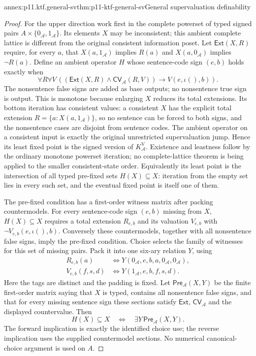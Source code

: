 \begin{annexitem}{annex:p11.ktf.general-sv}{thm:p11-ktf-general-sv}{General supervaluation definability}
\begin{proof}
For the upper direction work first in the complete powerset of
typed signed pairs \(A\times\{0_{\mathcal A},1_{\mathcal A}\}\).
Its elements \(X\) may be inconsistent; this ambient complete
lattice is different from the original consistent information poset.
Let \(\mathsf{Ext}(X,R)\) require, for every \(a\), that
\(X(a,1_{\mathcal A})\) implies \(R(a)\) and
\(X(a,0_{\mathcal A})\) implies \(\neg R(a)\).
Define an ambient operator \(H\) whose sentence-code sign
\((e,b)\) holds exactly when
\[
 \forall R\forall V\,
 ((\mathsf{Ext}(X,R)\land
       \mathsf{CV}_{\mathcal A}(R,V))
       \longrightarrow V(e,\iota(),b)).
\]
The nonsentence false signs are added as base outputs; no nonsentence
true sign is output. This is monotone because enlarging \(X\)
reduces its total extensions. Its bottom iteration has consistent
values: a consistent \(X\) has the explicit total extension
\(R=\{a:X(a,1_{\mathcal A})\}\), so no sentence can
be forced to both signs, and the nonsentence cases are disjoint
from sentence codes. The ambient operator on a consistent input
is exactly the original unrestricted supervaluation jump. Hence
its least fixed point is the signed version of
\(K_{\mathcal A}^{\mathrm V}\). Existence and leastness
follow by the ordinary monotone powerset iteration; no complete-lattice
theorem is being applied to the smaller consistent-state order.
Equivalently its least point is the intersection of all typed
pre-fixed sets \(H(X)\subseteq X\): iteration from the
empty set lies in every such set, and the eventual fixed point
is itself one of them.

The pre-fixed condition has a first-order witness matrix after
packing countermodels. For every sentence-code sign \((e,b)\)
missing from \(X\), \(H(X)\subseteq X\) requires a
total extension \(R_{e,b}\) and its valuation \(V_{e,b}\)
with \(\neg V_{e,b}(e,\iota(),b)\). Conversely these
countermodels, together with all nonsentence false signs, imply
the pre-fixed condition. Choice selects the family of witnesses
for this set of missing pairs. Pack it into one six-ary relation
\(Y\), using
\[
 \begin{split}
 R_{e,b}(a)&\Longleftrightarrow
 Y(0_{\mathcal A},e,b,a,0_{\mathcal A},0_{\mathcal A}),\\
 V_{e,b}(f,s,d)&\Longleftrightarrow
 Y(1_{\mathcal A},e,b,f,s,d).
 \end{split}
\]
Here the tags are distinct and the padding is fixed. Let
\(\mathsf{Pre}_{\mathcal A}(X,Y)\) be the finite first-order
matrix saying that \(X\) is typed, contains all nonsentence
false signs, and that for every missing sentence sign these
sections satisfy \(\mathsf{Ext}\), \(\mathsf{CV}_{\mathcal A}\)
and the displayed countervalue. Then
\[
 H(X)\subseteq X
 \quad\Longleftrightarrow\quad
 \exists Y\,\mathsf{Pre}_{\mathcal A}(X,Y).
\]
The forward implication is exactly the identified choice use;
the reverse implication uses the supplied countermodel sections.
No numerical canonical-choice argument is used on \(A\).


\end{proof}
\end{annexitem}
